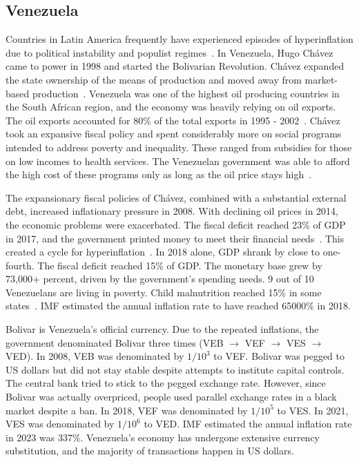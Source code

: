 \documentclass[dvipdfmx,a4paper]{article}
\begin{document}
\subsection{Venezuela}

Countries in Latin America frequently have experienced episodes of hyperinflation due to political instability and populist regimes~\cite{pittaluga2021political}. In Venezuela, Hugo Chávez came to power in 1998 and started the Bolivarian Revolution. Chávez expanded the state ownership of the means of production and moved away from market-based production~\cite{miller2019hyperinflation}. Venezuela was one of the highest oil producing countries in the South African region, and the economy was heavily relying on oil exports. The oil exports accounted for 80\% of the total exports in 1995 - 2002~\cite{manzano2014venezuela}. Chávez took an expansive fiscal policy and spent considerably more on social programs intended to address poverty and inequality. These ranged from subsidies for those on low incomes to health services. The Venezuelan government was able to afford the high cost of these programs only as long as the oil price stays high~\cite{reilly2020hyperinflation}.

The expansionary fiscal policies of Chávez, combined with a substantial external debt, increased inflationary pressure in 2008. With declining oil prices in 2014, the economic problems were exacerbated. The fiscal deficit reached 23\% of GDP in 2017, and the government printed money to meet their financial needs~\cite{mondal2023venezuela}. This created a cycle for hyperinflation~\cite{kulesza2017inflation}. In 2018 alone, GDP shrank by close to one-fourth. The fiscal deficit reached 15\% of GDP. The monetary base grew by 73,000+ percent, driven by the government's spending needs. 9 out of 10 Venezuelans are living in poverty. Child malnutrition reached 15\% in some states~\cite{huertas2019hyperinflation}. IMF estimated the annual inflation rate to have reached 65000\% in 2018.

Bolivar is Venezuela's official currency. Due to the repeated inflations, the government denominated Bolivar three times (VEB $\to$ VEF $\to$ VES $\to$ VED). In 2008, VEB was denominated by $1/10^3$ to VEF. Bolivar was pegged to US dollars but did not stay stable despite attempts to institute capital controls. The central bank tried to stick to the pegged exchange rate. However, since Bolivar was actually overpriced, people used parallel exchange rates in a black market despite a ban. In 2018, VEF was denominated by $1/10^5$ to VES. In 2021, VES was denominated by $1/10^6$ to VED. IMF estimated the annual inflation rate in 2023 was 337\%. Venezuela's economy has undergone extensive currency substitution, and the majority of transactions happen in US dollars.
\end{document}
